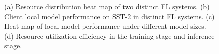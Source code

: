 \begin{figure}
    \vspace{-10px}

  \centering
    \vspace{-20px}

  \caption{(a) Resource distribution heat map of two distinct FL systems. (b) Client local model performance on SST-2 in distinct FL systems. (c) Heat map of local model performance under different model sizes. (d) Resource utilization efficiency in the training stage and inference stage.}
  \label{fig:sys_heto}
\end{figure}
